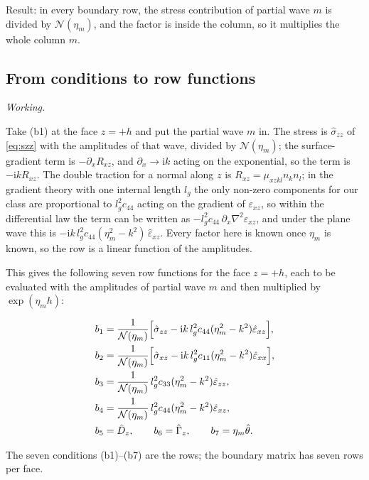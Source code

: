 \documentclass[11pt,a4paper]{article}
\newif\ifshowworked \showworkedtrue
\newenvironment{worked}{\ifshowworked\par\smallskip\noindent\textit{Working.}\par\else\setbox0\vbox\bgroup\fi}{\ifshowworked\par\smallskip\else\egroup\fi}
\newcommand{\Nc}{\mathcal{N}}
\newcommand{\eps}{\varepsilon}
\newcommand{\ii}{\mathrm{i}}
\begin{document}
\noindent Result: in every boundary row, the stress contribution of partial wave $m$ is divided by
$\Nc(\eta_m)$, and the factor is inside the column, so it multiplies the whole column $m$.

\subsection{From conditions to row functions}

\begin{worked}
Take (b1) at the face $z=+h$ and put the partial wave $m$ in. The stress is $\hat\sigma_{zz}$ of
\eqref{eq:szz} with the amplitudes of that wave, divided by $\Nc(\eta_m)$; the surface-gradient term is
$-\partial_xR_{xz}$, and $\partial_x\to\ii k$ acting on the exponential, so the term is
$-\ii kR_{xz}$. The double traction for a normal along $z$ is $R_{xz}=\mu_{xzkl}n_kn_l$; in the gradient
theory with one internal length $l_g$ the only non-zero components for our class are proportional to
$l_g^2c_{44}$ acting on the gradient of $\eps_{xz}$, so within the differential law the term can be written
as $-l_g^2c_{44}\,\partial_x\nabla^2\eps_{xz}$, and under the plane wave this is
$-\ii k\,l_g^2c_{44}(\eta_m^2-k^2)\,\hat\eps_{xz}$. Every factor here is known once $\eta_m$ is known, so
the row is a linear function of the amplitudes.
\end{worked}

\noindent This gives the following seven row functions for the face $z=+h$, each to be evaluated with the
amplitudes of partial wave $m$ and then multiplied by $\exp(\eta_mh)$:

\begin{align}
b_1&=\frac{1}{\Nc(\eta_m)}\Bigl[\hat\sigma_{zz}-\ii k\,l_g^2c_{44}(\eta_m^2-k^2)\hat\eps_{xz}\Bigr],
\label{eq:b1}\\
b_2&=\frac{1}{\Nc(\eta_m)}\Bigl[\hat\sigma_{xz}-\ii k\,l_g^2c_{11}(\eta_m^2-k^2)\hat\eps_{xx}\Bigr],
\label{eq:b2}\\
b_3&=\frac{1}{\Nc(\eta_m)}\,l_g^2c_{33}(\eta_m^2-k^2)\hat\eps_{zz},
\label{eq:b3}\\
b_4&=\frac{1}{\Nc(\eta_m)}\,l_g^2c_{44}(\eta_m^2-k^2)\hat\eps_{xz},
\label{eq:b4}\\
b_5&=\hat D_z ,\qquad
b_6=\hat\Gamma_z ,\qquad
b_7=\eta_m\hat\theta .
\label{eq:b567}
\end{align}

The seven conditions (b1)--(b7) are the rows; the boundary matrix has seven rows per face.
\end{document}
